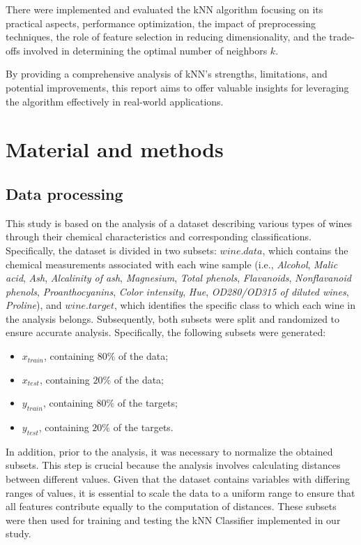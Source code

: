 \documentclass[9pt,technote]{IEEEtran}
\begin{document}
There were implemented and evaluated the kNN algorithm focusing on its practical aspects, performance optimization, the impact of preprocessing techniques, the role of feature selection in reducing dimensionality, and the trade-offs involved in determining the optimal number of neighbors $k$.

By providing a comprehensive analysis of kNN's strengths, limitations, and potential improvements, this report aims to offer valuable insights for leveraging the algorithm effectively in real-world applications.
\section{Material and methods}

\subsection{Data processing}
This study is based on the analysis of a dataset describing various types of wines through their chemical characteristics and corresponding classifications. Specifically, the dataset is divided in two subsets: $wine.data$, which contains the chemical measurements associated with each wine sample (i.e., \textit{Alcohol}, \textit{Malic acid}, \textit{Ash}, \textit{Alcalinity of ash}, \textit{Magnesium}, \textit{Total phenols}, \textit{Flavanoids}, \textit{Nonflavanoid phenols}, \textit{Proanthocyanins}, \textit{Color intensity}, \textit{Hue}, \textit{OD280/OD315 of diluted wines}, \textit{Proline}), and $wine.target$, which identifies the specific class to which each wine in the analysis belongs.
Subsequently, both subsets were split and randomized to ensure accurate analysis. Specifically, the following subsets were generated:


\begin{itemize}
	\item $x_{train}$, containing $80\%$ of the data;
	\item  $x_{test}$, containing $20\%$ of the data;
	\item $y_{train}$, containing $80\%$ of the targets;
	\item $y_{test}$, containing $20\%$ of the targets.
\end{itemize}
In addition, prior to the analysis, it was necessary to normalize the obtained subsets. This step is crucial because the analysis involves calculating distances between different values. Given that the dataset contains variables with differing ranges of values, it is essential to scale the data to a uniform range to ensure that all features contribute equally to the computation of distances.
These subsets were then used for training and testing the kNN Classifier implemented in our study.
\end{document}
